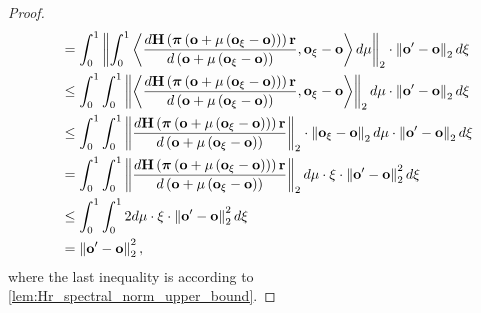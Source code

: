 \begin{proof}
\begin{equation*}
\begin{split}
    &\quad = \int_0^1{ \left\| \int_0^1{\left\langle \frac{d {\mathbf{H}} \left( {\boldsymbol{\pi}}\left( {\mathbf{o}} + \mu\left( {\mathbf{o}}_{\xi} - {\mathbf{o}} \right) \right) \right) {\mathbf{r}} }{d \left( {\mathbf{o}} + \mu\left( {\mathbf{o}}_{\xi} - {\mathbf{o}} \right) \right)}, {\mathbf{o}}_{\xi} - {\mathbf{o}} \right\rangle d\mu} \right\|_2 \cdot \left\| {\mathbf{o}}^\prime - {\mathbf{o}} \right\|_2 d\xi} \\
    &\quad \le \int_0^1{  \int_0^1{ \left\| \left\langle \frac{d {\mathbf{H}} \left( {\boldsymbol{\pi}}\left( {\mathbf{o}} + \mu\left( {\mathbf{o}}_{\xi} - {\mathbf{o}} \right) \right) \right) {\mathbf{r}} }{d \left( {\mathbf{o}} + \mu\left( {\mathbf{o}}_{\xi} - {\mathbf{o}} \right) \right)}, {\mathbf{o}}_{\xi} - {\mathbf{o}} \right\rangle \right\|_2 d\mu} \cdot \left\| {\mathbf{o}}^\prime - {\mathbf{o}} \right\|_2 d\xi} \\
    &\quad \le \int_0^1{  \int_0^1{ \left\| \frac{d {\mathbf{H}} \left( {\boldsymbol{\pi}}\left( {\mathbf{o}} + \mu\left( {\mathbf{o}}_{\xi} - {\mathbf{o}} \right) \right) \right) {\mathbf{r}} }{d \left( {\mathbf{o}} + \mu\left( {\mathbf{o}}_{\xi} - {\mathbf{o}} \right) \right)} \right\|_2 \cdot \left\| {\mathbf{o}}_{\xi} - {\mathbf{o}} \right\|_2 d\mu} \cdot \left\| {\mathbf{o}}^\prime - {\mathbf{o}} \right\|_2 d\xi} \\
    &\quad = \int_0^1{  \int_0^1{ \left\| \frac{d {\mathbf{H}} \left( {\boldsymbol{\pi}}\left( {\mathbf{o}} + \mu\left( {\mathbf{o}}_{\xi} - {\mathbf{o}} \right) \right) \right) {\mathbf{r}} }{d \left( {\mathbf{o}} + \mu\left( {\mathbf{o}}_{\xi} - {\mathbf{o}} \right) \right)} \right\|_2 d\mu} \cdot \xi \cdot \left\| {\mathbf{o}}^\prime - {\mathbf{o}} \right\|_2^2 d\xi} \\
    &\quad \le \int_0^1{  \int_0^1{ 2 d\mu} \cdot \xi \cdot \left\| {\mathbf{o}}^\prime - {\mathbf{o}} \right\|_2^2 d\xi} \\
    &\quad = \left\| {\mathbf{o}}^\prime - {\mathbf{o}} \right\|_2^2,
\end{split}
\end{equation*}
where the last inequality is according to \cref{lem:Hr_spectral_norm_upper_bound}.
\end{proof}

